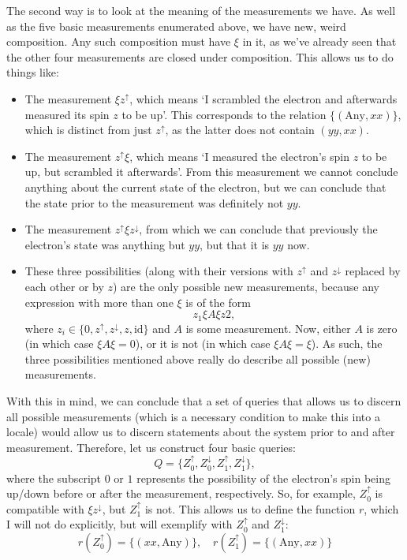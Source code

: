 \documentclass{article}
\theoremstyle{definition}
\theoremstyle{plain}
\newcommand{\id}{\mathrm{id}}
\begin{document}
The second way is to look at the meaning of the measurements we have. As well as the five basic measurements enumerated above, we have new, weird composition. Any such composition must have $\xi$ in it, as we've already seen that the other four measurements are closed under composition. This allows us to do things like:
\begin{itemize}
\item The measurement $\xi z^\uparrow$, which means `I scrambled the electron and afterwards measured its spin $z$ to be up'. This corresponds to the relation $\{(\text{Any}, xx)\}$, which is distinct from just $z^\uparrow$, as the latter does not contain $(yy,xx)$.

\item The measurement $z^\uparrow \xi$, which means `I measured the electron's spin $z$ to be up, but scrambled it afterwards'. From this measurement we cannot conclude anything about the current state of the electron, but we can conclude that the state prior to the measurement was definitely not $yy$.

\item The measurement $z^\uparrow \xi z^\downarrow$, from which we can conclude that previously the electron's state was anything but $yy$, but that it is $yy$ now.

\item These three possibilities (along with their versions with $z^\uparrow$ and $z^\downarrow$ replaced by each other or by $z$) are the only possible new measurements, because any expression with more than one $\xi$ is of the form
\begin{equation}
z_1 \xi A \xi z2,
\end{equation}
where $z_i \in \{0,z^\uparrow,z^\downarrow,z, \id\}$ and $A$ is some measurement. Now, either $A$ is zero (in which case $\xi A \xi = 0$), or it is not (in which case $\xi A \xi = \xi$). As such, the three possibilities mentioned above really do describe all possible (new) measurements.
\end{itemize}

With this in mind, we can conclude that a set of queries that allows us to discern all possible measurements (which is a necessary condition to make this into a locale) would allow us to discern statements about the system prior to and after measurement. Therefore, let us construct four basic queries:
\begin{equation}
Q = \{Z^\uparrow_0, Z^\downarrow_0, Z^\uparrow_1, Z^\downarrow_1\},
\end{equation}
where the subscript $0$ or $1$ represents the possibility of the electron's spin being up/down before or after the measurement, respectively. So, for example, $Z^\uparrow_0$ is compatible with $\xi z^\downarrow$, but $Z^\uparrow_1$ is not. This allows us to define the function $r$, which I will not do explicitly, but will exemplify with $Z^\uparrow_0$ and $Z^\downarrow_1$:
\begin{equation}
r(Z^\uparrow_0) = \{(xx, \text{Any})\}, \quad r(Z^\uparrow_1) = \{(\text{Any}, xx)\}
\end{equation}
\end{document}
